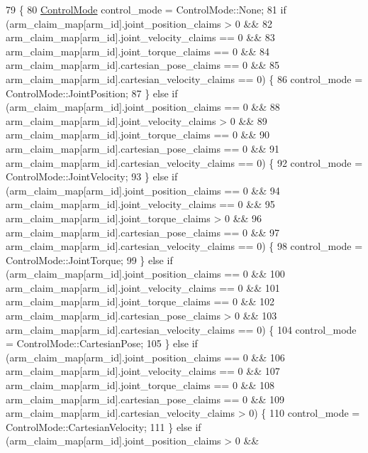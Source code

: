 \begin{DoxyCode}
79                                                                                   \{
80   \hyperlink{namespacefranka__hw_afa416558ce4baace5ac6c71bd5d2c98c}{ControlMode} control\_mode = ControlMode::None;
81   \textcolor{keywordflow}{if} (arm\_claim\_map[arm\_id].joint\_position\_claims > 0 &&
82       arm\_claim\_map[arm\_id].joint\_velocity\_claims == 0 &&
83       arm\_claim\_map[arm\_id].joint\_torque\_claims == 0 &&
84       arm\_claim\_map[arm\_id].cartesian\_pose\_claims == 0 &&
85       arm\_claim\_map[arm\_id].cartesian\_velocity\_claims == 0) \{
86     control\_mode = ControlMode::JointPosition;
87   \} \textcolor{keywordflow}{else} \textcolor{keywordflow}{if} (arm\_claim\_map[arm\_id].joint\_position\_claims == 0 &&
88              arm\_claim\_map[arm\_id].joint\_velocity\_claims > 0 &&
89              arm\_claim\_map[arm\_id].joint\_torque\_claims == 0 &&
90              arm\_claim\_map[arm\_id].cartesian\_pose\_claims == 0 &&
91              arm\_claim\_map[arm\_id].cartesian\_velocity\_claims == 0) \{
92     control\_mode = ControlMode::JointVelocity;
93   \} \textcolor{keywordflow}{else} \textcolor{keywordflow}{if} (arm\_claim\_map[arm\_id].joint\_position\_claims == 0 &&
94              arm\_claim\_map[arm\_id].joint\_velocity\_claims == 0 &&
95              arm\_claim\_map[arm\_id].joint\_torque\_claims > 0 &&
96              arm\_claim\_map[arm\_id].cartesian\_pose\_claims == 0 &&
97              arm\_claim\_map[arm\_id].cartesian\_velocity\_claims == 0) \{
98     control\_mode = ControlMode::JointTorque;
99   \} \textcolor{keywordflow}{else} \textcolor{keywordflow}{if} (arm\_claim\_map[arm\_id].joint\_position\_claims == 0 &&
100              arm\_claim\_map[arm\_id].joint\_velocity\_claims == 0 &&
101              arm\_claim\_map[arm\_id].joint\_torque\_claims == 0 &&
102              arm\_claim\_map[arm\_id].cartesian\_pose\_claims > 0 &&
103              arm\_claim\_map[arm\_id].cartesian\_velocity\_claims == 0) \{
104     control\_mode = ControlMode::CartesianPose;
105   \} \textcolor{keywordflow}{else} \textcolor{keywordflow}{if} (arm\_claim\_map[arm\_id].joint\_position\_claims == 0 &&
106              arm\_claim\_map[arm\_id].joint\_velocity\_claims == 0 &&
107              arm\_claim\_map[arm\_id].joint\_torque\_claims == 0 &&
108              arm\_claim\_map[arm\_id].cartesian\_pose\_claims == 0 &&
109              arm\_claim\_map[arm\_id].cartesian\_velocity\_claims > 0) \{
110     control\_mode = ControlMode::CartesianVelocity;
111   \} \textcolor{keywordflow}{else} \textcolor{keywordflow}{if} (arm\_claim\_map[arm\_id].joint\_position\_claims > 0 &&

\end{DoxyCode}

